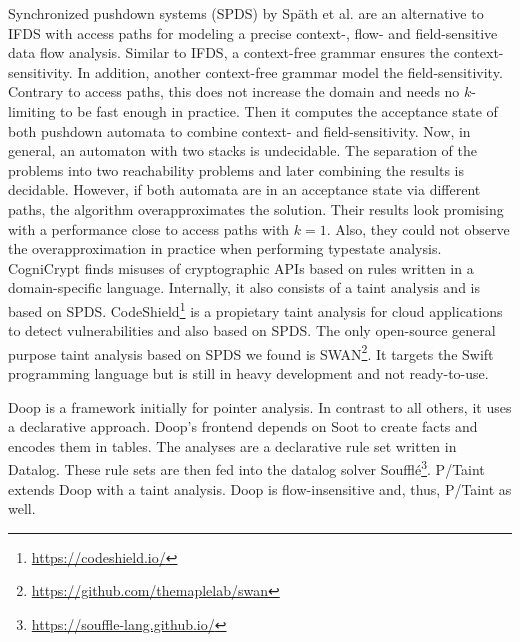 \documentclass[../draft.tex]{subfiles}
\begin{document}
    Synchronized pushdown systems (SPDS) by Späth et al.\cite{Spaeth2019} are an alternative to IFDS with access paths for modeling a precise context-, flow- and field-sensitive data flow analysis.
    Similar to IFDS, a context-free grammar ensures the context-sensitivity.
    In addition, another context-free grammar model the field-sensitivity.
    Contrary to access paths, this does not increase the domain and needs no $k$-limiting to be fast enough in practice.
    Then it computes the acceptance state of both pushdown automata to combine context- and field-sensitivity.
    Now, in general, an automaton with two stacks is undecidable.
    The separation of the problems into two reachability problems and later combining the results is decidable.
    However, if both automata are in an acceptance state via different paths, the algorithm overapproximates the solution.
    Their results look promising with a performance close to access paths with $k=1$.
    Also, they could not observe the overapproximation in practice when performing typestate analysis.\\
    CogniCrypt \cite{Krueger2017} finds misuses of cryptographic APIs based on rules written in a domain-specific language.
    Internally, it also consists of a taint analysis and is based on SPDS.
    CodeShield\footnote{\url{https://codeshield.io/}} is a propietary taint analysis for cloud applications to detect vulnerabilities and also based on SPDS.
    The only open-source general purpose taint analysis based on SPDS we found is SWAN\footnote{\url{https://github.com/themaplelab/swan}}.
    It targets the Swift programming language but is still in heavy development and not ready-to-use.

    Doop\cite{Bravenboer2009} is a framework initially for pointer analysis.
    In contrast to all others, it uses a declarative approach.
    Doop's frontend depends on Soot to create facts and encodes them in tables.
    The analyses are a declarative rule set written in Datalog.
    These rule sets are then fed into the datalog solver Soufflé\footnote{\url{https://souffle-lang.github.io/}}.
    P/Taint\cite{Grech2017} extends Doop with a taint analysis.
    Doop is flow-insensitive and, thus, P/Taint as well.
\end{document}
